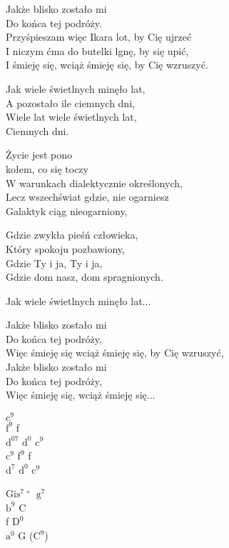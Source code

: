 
\begin{text}
    Jakże blisko zostało mi\\
    Do końca tej podróży.\\
    Przyśpieszam więc Ikara lot, by Cię ujrzeć\\
    I niczym ćma do butelki lgnę, by się upić,\\
    I śmieję się, wciąż śmieję się, by Cię wzruszyć.

    \vin Jak wiele świetlnych minęło lat,\\
    \vin A pozostało ile ciemnych dni,\\
    \vin Wiele lat wiele świetlnych lat,\\
    \vin Ciemnych dni.

    Życie jest pono\\
    kołem, co się toczy\\
    W warunkach dialektycznie określonych,\\
    Lecz wszechświat gdzie, nie ogarniesz\\
    Galaktyk ciąg nieogarniony,

    Gdzie zwykła pieśń człowieka,\\
    Który spokoju pozbawiony,\\
    Gdzie Ty i ja, Ty i ja,\\
    Gdzie dom nasz, dom spragnionych.

    Jak wiele świetlnych minęło lat...

    Jakże blisko zostało mi\\
    Do końca tej podróży,\\
    Więc śmieję się wciąż śmieję się, by Cię wzruszyć,\\
    Jakże blisko zostało mi\\
    Do końca tej podróży,\\
    Więc śmieję się, wciąż śmieję się...
\end{text}
\begin{chord}
    $\mathrm{c^{9}}$\\
    $\mathrm{f^{9}}$ f\\
    $\mathrm{d^{07}}$ $\mathrm{d^{0}}$ $\mathrm{c^{9}}$\\
    $\mathrm{c^{9}}$ $\mathrm{f^{9}}$ f\\
    $\mathrm{d^{7}}$ $\mathrm{d^{0}}$ $\mathrm{c^{9}}$

    $\mathrm{Gis^{7+}}$ $\mathrm{g^{7}}$\\
    $\mathrm{b^{9}}$ C\\
    f $\mathrm{D^{0}}$\\
    $\mathrm{a^{0}}$ G ($\mathrm{C^{9}}$)

\end{chord}
